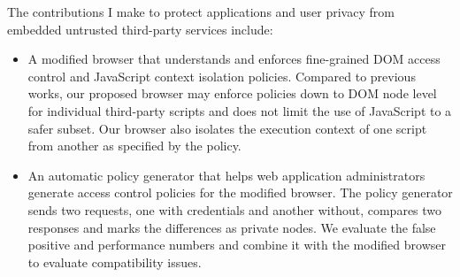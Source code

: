 \vspace*{8pt}The contributions I make to protect applications and user privacy from embedded untrusted third-party services include:

\begin{itemize}

\item A modified browser that understands and enforces fine-grained DOM access control and JavaScript context isolation policies.  Compared to previous works, our proposed browser may enforce policies down to DOM node level for individual third-party scripts and does not limit the use of JavaScript to a safer subset.  Our browser also isolates the execution context of one script from another as specified by the policy.  

\item An automatic policy generator that helps web application administrators generate access control policies for the modified browser.  The policy generator sends two requests, one with credentials and another without, compares two responses and marks the differences as private nodes.  We evaluate the false positive and performance numbers and combine it with the modified browser to evaluate compatibility issues.

\end{itemize}